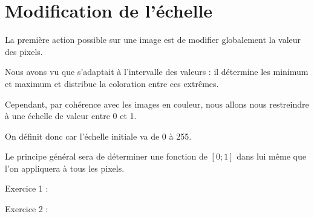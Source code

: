 \section{Modification de l'échelle}

La première action possible sur une image est de modifier globalement la valeur des pixels.

Nous avons vu que  s'adaptait à l'intervalle des valeurs : il détermine les minimum et maximum et distribue la coloration entre ces extrêmes.

Cependant, par cohérence avec les images en couleur, nous allons nous restreindre à une échelle de valeur entre 0 et 1.

On définit donc  car l'échelle initiale va de 0 à 255.

Le principe général sera de déterminer une fonction de $[0;1]$ dans lui même que l'on appliquera à tous les pixels.

\begin{center}

Exercice 1 : 
\hskip 2cm
Exercice 2 : 
\end{center}

